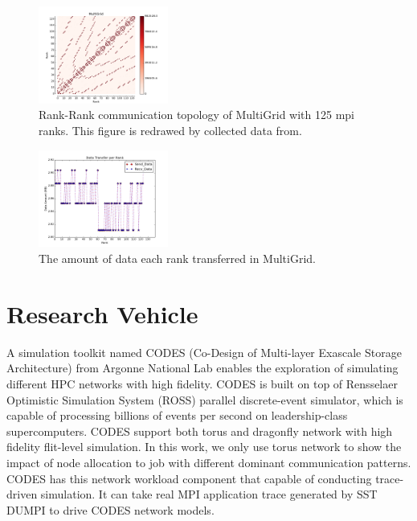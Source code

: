 \documentclass[conference]{IEEEtran}
\begin{document}
\begin{figure}[h!] 
  \centering
  \includegraphics[width=0.38\textwidth]{figs/appstudy/mg/mg125_ct}
   \caption{Rank-Rank communication topology of MultiGrid with 125 mpi ranks. This figure is redrawed by collected data from\cite{design forward webpage}. }
   \label{fig: multigrid125 communication topology}
\end{figure}

\begin{figure}[h!] 
  \centering
  \includegraphics[width=0.38\textwidth]{figs/appstudy/mg/mg_data_transfer}
   \caption{The amount of data each rank transferred in MultiGrid. }
   \label{fig: cr data trans}
\end{figure}


\section{Research Vehicle}
\label{sec:simulation}

A simulation toolkit named CODES (Co-Design of Multi-layer Exascale Storage Architecture) from Argonne National Lab enables the exploration of simulating different HPC networks with high fidelity\cite{Jason-2011}\cite{mubarak-sc2012}. CODES is built on top of Rensselaer Optimistic Simulation System (ROSS) parallel discrete-event simulator, which is capable of processing billions of events per second on leadership-class supercomputers\cite{ross}. CODES support both torus and dragonfly network with high fidelity flit-level simulation. In this work, we only use torus network to show the impact of node allocation to job with different dominant communication patterns. CODES has this network workload component that capable of conducting trace-driven simulation. It can take real MPI application trace generated by SST DUMPI\cite{sst} to drive CODES network models. 
\end{document}
